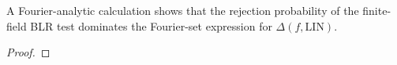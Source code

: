 \begin{theorem}
\label{lem:ff-spectral-bound}
\leanok
A Fourier-analytic calculation shows that the rejection probability
  of the finite-field BLR test dominates the Fourier-set expression for
  $\Delta(f,\mathrm{LIN})$.
\end{theorem}
\begin{proof}
\end{proof}
